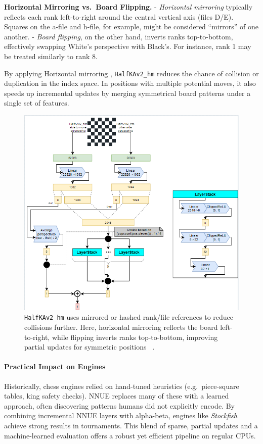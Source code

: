 \documentclass[12pt,a4paper]{article}
\begin{document}
\medskip

\noindent
\textbf{Horizontal Mirroring vs.\ Board Flipping.}  
- \emph{Horizontal mirroring} typically reflects each rank left-to-right around the central vertical axis (files D/E). Squares on the a-file and h-file, for example, might be considered “mirrors” of one another.  
- \emph{Board flipping}, on the other hand, inverts ranks top-to-bottom, effectively swapping White’s perspective with Black’s. For instance, rank 1 may be treated similarly to rank 8.

By applying Horizontal mirroring , \texttt{HalfKAv2\_hm} reduces the chance of collision or duplication in the index space. In positions with multiple potential moves, it also speeds up incremental updates by merging symmetrical board patterns under a single set of features.

\begin{figure}[H]
    \centering
    \includegraphics[width=1\textwidth]{figures/1.png}
    \caption{\texttt{HalfKAv2\_hm} uses mirrored or hashed rank/file references 
    to reduce collisions further. Here, horizontal mirroring reflects the board 
    left-to-right, while flipping inverts ranks top-to-bottom, improving partial 
    updates for symmetric positions ~\cite{githubdocs}.}
    \label{fig:halfkav2_hm}
\end{figure}


\paragraph{Practical Impact on Engines}
Historically, chess engines relied on hand-tuned heuristics (e.g.\ piece-square tables, king safety checks). NNUE replaces many of these with a learned approach, often discovering patterns humans did not explicitly encode. By combining incremental NNUE layers with alpha-beta, engines like \emph{Stockfish} achieve strong results in tournaments. This blend of sparse, partial updates and a machine-learned evaluation offers a robust yet efficient pipeline on regular CPUs.
\end{document}
